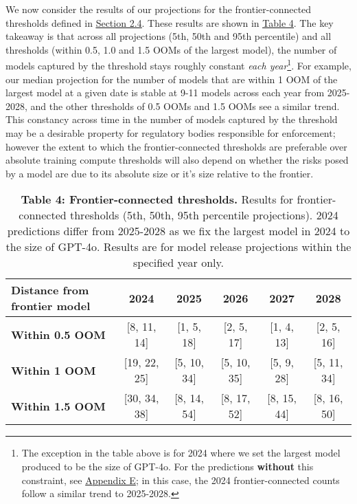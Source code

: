 \documentclass[11pt]{article}
\begin{document}
We now consider the results of our projections for the frontier-connected thresholds defined in \underline{\hyperref[frontier-connected-thresholds]{Section 2.4}}. These results are shown in \underline{\hyperref[table-4-frontier-connected-thresholds.-results-for-frontier-connected-thresholds-5th-50th-95th-percentile-projections.-2024-predictions-differ-from-2025-2028-as-we-fix-the-largest-model-in-2024-to-the-size-of-gpt-4o.-results-are-for-model-release-projections-within-the-specified-year-only.]{Table 4}}. The key takeaway is that across all projections (5th, 50th and 95th percentile) and all thresholds (within 0.5, 1.0 and 1.5 OOMs of the largest model), the number of models captured by the threshold stays roughly constant \textit{each year}\footnote{The exception in the table above is for 2024 where we set the largest model produced to be the size of GPT-4o. For the predictions \textbf{without} this constraint, see \hyperref[appendix-e-2024-predictions-under-uniform-sampling-of-lms]{Appendix E}; in this case, the 2024 frontier-connected counts follow a similar trend to 2025-2028.}. For example, our median projection for the number of models that are within 1 OOM of the largest model at a given date is stable at 9-11 models across each year from 2025-2028, and the other thresholds of 0.5 OOMs and 1.5 OOMs see a similar trend. This constancy across time in the number of models captured by the threshold may be a desirable property for regulatory bodies responsible for enforcement; however the extent to which the frontier-connected thresholds are preferable over absolute training compute thresholds will also depend on whether the risks posed by a model are due to its absolute size or it's size relative to the frontier.

\begin{table}[h]
\centering
\caption*{\textbf{Table 4: Frontier-connected thresholds.} Results for frontier-connected thresholds (5th, 50th, 95th percentile projections). 2024 predictions differ from 2025-2028 as we fix the largest model in 2024 to the size of GPT-4o. Results are for model release projections within the specified year only.}
\label{table-4-frontier-connected-thresholds.-results-for-frontier-connected-thresholds-5th-50th-95th-percentile-projections.-2024-predictions-differ-from-2025-2028-as-we-fix-the-largest-model-in-2024-to-the-size-of-gpt-4o.-results-are-for-model-release-projections-within-the-specified-year-only.}
\begin{tabular}{|l|c|c|c|c|c|}
\hline
Distance from frontier model & \textbf{2024} & \textbf{2025} & \textbf{2026} & \textbf{2027} & \textbf{2028} \\
\hline
\textbf{Within 0.5 OOM} & [8, 11, 14] & [1, 5, 18] & [2, 5, 17] & [1, 4, 13] & [2, 5, 16] \\
\hline
\textbf{Within 1 OOM} & [19, 22, 25] & [5, 10, 34] & [5, 10, 35] & [5, 9, 28] & [5, 11, 34] \\
\hline
\textbf{Within 1.5 OOM} & [30, 34, 38] & [8, 14, 54] & [8, 17, 52] & [8, 15, 44] & [8, 16, 50] \\
\hline
\end{tabular}
\end{table}
\end{document}
